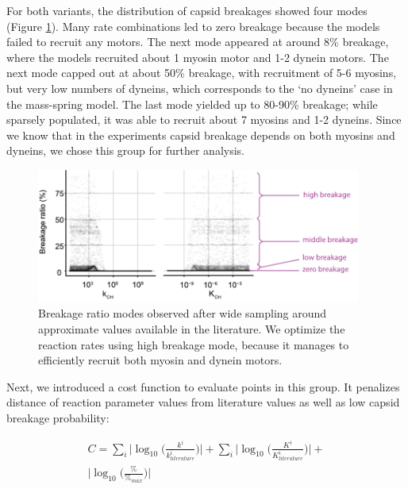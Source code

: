 For both variants, the distribution of capsid breakages showed four modes (Figure \ref{figure:BreakageModesRatesSelection}). Many rate combinations led to zero breakage because the models failed to recruit any motors. The next mode appeared at around 8\% breakage, where the models recruited about 1 myosin motor and 1-2 dynein motors. The next mode capped out at about 50\% breakage, with recruitment of 5-6 myosins, but very low numbers of dyneins, which corresponds to the ‘no dyneins’ case in the mass-spring model. The last mode yielded up to 80-90\% breakage; while sparsely populated, it was able to recruit about 7 myosins and 1-2 dyneins. Since we know that in the experiments capsid breakage depends on both myosins and dyneins, we chose this group for further analysis.

\begin{figure}
\begin{center}
\includegraphics[width=0.95\textwidth, trim={0cm 0cm 0cm 0cm}, clip]{D_chapters/2_ReactionModel/ratesSelection.pdf}
\caption[Breakage ratio modes]%
{Breakage ratio modes observed after  wide sampling around approximate values available in the literature. We optimize the reaction rates using high breakage mode, because it manages to efficiently recruit both myosin and dynein motors.}
\label{figure:BreakageModesRatesSelection}
\end{center}
\end{figure}

Next, we introduced a cost function to evaluate points in this group. It penalizes distance of reaction parameter values from literature values as well as low capsid breakage probability:

\begin{equation}
\begin{split}
C = \sum_{i} \big| \log_{10} \big( \frac{k^i}{k^i_{literature}} \big) \big| +
\sum_{i} \big| \log_{10} \big( \frac{K^i}{K^i_{literature}} \big) \big| + \\
\big| \log_{10} \big( \frac{\%}{\%_{max}} \big) \big|
\end{split}
\end{equation}

